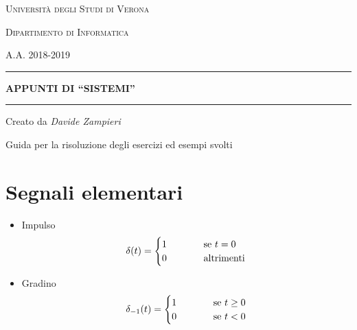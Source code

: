 \documentclass[a4paper]{article}
\begin{document}
	\begin{titlepage}
		\centering
		\vspace*{\fill}
		{\scshape\LARGE Università degli Studi di Verona \par}
		{\scshape\LARGE Dipartimento di Informatica \par}
		{\scshape\LARGE A.A. 2018-2019 \par}
		\vspace{2cm} 
		
		\hrule
		\vspace{0.5cm}
		{\huge\bfseries APPUNTI DI ``SISTEMI'' \par}
		\vspace{0.5cm}
		\hrule
		\vspace{2.0cm}
		
		{\LARGE Creato da \textit{Davide Zampieri} \par}
		\vspace{1.0cm}
		Guida per la risoluzione degli esercizi ed esempi svolti \par
		\vspace{4.0cm}
		
		\vspace*{\fill}
	\end{titlepage}
	
	\tableofcontents
	\setcounter{tocdepth}{2}
	\newpage
	

	\section{Segnali elementari}

	\begin{itemize}
		\item Impulso
			\[
			\delta (t) =
				\begin{cases}
				1& \hspace{1.0cm} \text{se } t = 0 \\
				0& \hspace{1.0cm} \text{altrimenti}
				\end{cases}
			\]
		\item Gradino
			\[
			\delta_{-1} (t) =
				\begin{cases}
				1& \hspace{1.0cm} \text{se } t \geq 0 \\
				0& \hspace{1.0cm} \text{se } t < 0
				\end{cases}
			\]
	\end{itemize}
	
\end{document}
